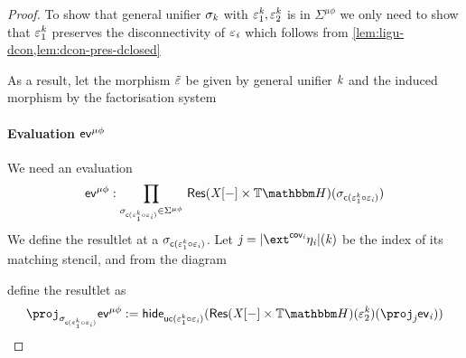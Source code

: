 \begin{proof}
    To show that general unifier $\sigma_{\mathit{k}}$ with $\varepsilon^{\mathit{k}}_1, \varepsilon^{\mathit{k}}_2$ is in $\Sigma^{\mu\phi}$ we only need to show that  
    $\varepsilon^{\mathit{k}}_1$ preserves the disconnectivity of $\varepsilon_{\mathit{i}}$ which follows from \cref{lem:ligu-dcon,lem:dcon-pres-dclosed}
    \begin{center}
    \end{center}
    As a result, let the morphism $\tilde{\varepsilon}$ be given by general unifier $\mathit{k}$ and the induced morphism by the factorisation system
      
    \paragraph{Evaluation $\mathsf{ev}^{\mu\phi}$}
    
    We need an evaluation 
    \[ \ev^{\mu\phi} : \Prod{\sigma_{\con{\me^\vk_1 \comp \me_\vi}} \in \Sigma^{\mu\phi}} \typeRes(\vX\anyL\dash \times \theapF)(\sigma_{\con{\me^\vk_1 \comp \me_\vi}}) \]
    We define the resultlet at a $\sigma_{\mathsf{c}(\varepsilon^{\mathit{k}}_1 \circ \varepsilon_{\mathit{i}})}$. 
    Let $\vj = \indF{\ext^{\cov_\vi}\mvarM_\vi}(\vk)$ be the index of its matching stencil, and from the diagram
    define the resultlet as
    \[ \proj_{\sigma_{\con{\me^\vk_1 \comp \me_\vi}}} \ev^{\mu\phi} \eqdef 
            \hideRes\relax{\uncon{\me^\vk_1 \comp \me_\vi}} (\typeRes(\vX\anyL\dash \times \theapF)(\me^\vk_2)(\proj_\vj \ev_\vi)) \]


\end{proof}
